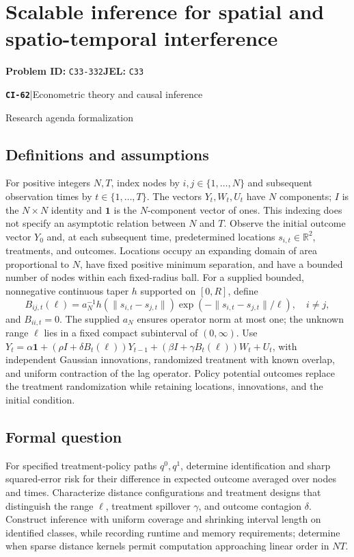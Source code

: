 \documentclass[11pt,a4paper]{article}
\newcommand{\R}{\mathbb R}
\newcommand{\entrymeta}[3]{{\sffamily\small\color{muted}\textbf{\texttt{#1}}\quad|\quad #2\par #3\par}}
\begin{document}
\section*{Scalable inference for spatial and spatio-temporal interference}
\textbf{Problem ID:} \texttt{C33-332}\quad \textbf{JEL:} \texttt{C33}\par
\label{problem:OP-0541}
\label{beyond:CI-62}
\entrymeta{CI-62}{Econometric theory and causal inference}{Research agenda formalization}
\subsection*{Definitions and assumptions}
For positive integers $N,T$, index nodes by $i,j\in\{1,\ldots,N\}$ and subsequent observation times by $t\in\{1,\ldots,T\}$. The vectors $Y_t,W_t,U_t$ have $N$ components; $I$ is the $N\times N$ identity and $\mathbf1$ is the $N$-component vector of ones. This indexing does not specify an asymptotic relation between $N$ and $T$.
Observe the initial outcome vector $Y_0$ and, at each subsequent time, predetermined locations $s_{i,t}\in\R^2$, treatments, and outcomes. Locations occupy an expanding domain of area proportional to $N$, have fixed positive minimum separation, and have a bounded number of nodes within each fixed-radius ball. For a supplied bounded, nonnegative continuous taper $h$ supported on $[0,R]$, define
\[
 B_{ij,t}(\ell)=a_N^{-1}h(\|s_{i,t}-s_{j,t}\|)
                  \exp(-\|s_{i,t}-s_{j,t}\|/\ell),\quad i\ne j,
\]
and $B_{ii,t}=0$. The supplied $a_N$ ensures operator norm at most one; the unknown range $\ell$ lies in a fixed compact subinterval of $(0,\infty)$. Use
$Y_t=\alpha\mathbf1+(\rho I+\delta B_t(\ell))Y_{t-1}
+(\beta I+\gamma B_t(\ell))W_t+U_t$,
with independent Gaussian innovations, randomized treatment with known overlap, and uniform contraction of the lag operator. Policy potential outcomes replace the treatment randomization while retaining locations, innovations, and the initial condition.
\subsection*{Formal question}
For specified treatment-policy paths $q^0,q^1$, determine identification and sharp squared-error risk for their difference in expected outcome averaged over nodes and times. Characterize distance configurations and treatment designs that distinguish the range $\ell$, treatment spillover $\gamma$, and outcome contagion $\delta$. Construct inference with uniform coverage and shrinking interval length on identified classes, while recording runtime and memory requirements; determine when sparse distance kernels permit computation approaching linear order in $NT$.
\end{document}
